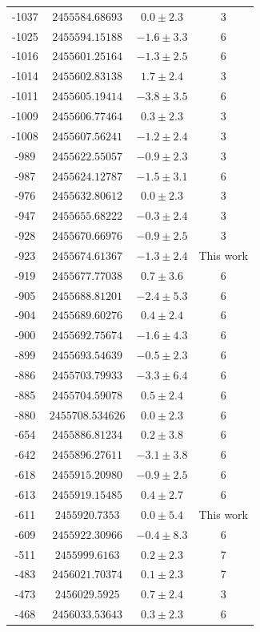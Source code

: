 \begin{ThreePartTable}
\begin{longtable}{cccc}
-1037 & $2455584.68693$ & $0.0\pm2.3$ & 3 \\
-1025 & $2455594.15188$ &  $-1.6\pm3.3$ & 6 \\
-1016 & $2455601.25164$ & $-1.3\pm2.5$ & 6\\
-1014 & $2455602.83138$ & $1.7\pm2.4$ & 3 \\
-1011 & $2455605.19414$ & $-3.8\pm3.5$ & 6 \\
-1009 & $2455606.77464$ & $0.3\pm2.3$ & 3 \\
-1008 & $2455607.56241$ & $-1.2\pm2.4$ & 3 \\
-989 & $2455622.55057$ & $-0.9\pm2.3$ & 3 \\
-987 & $2455624.12787$ & $-1.5\pm3.1$ & 6 \\
-976 & $2455632.80612$ & $0.0\pm2.3$ & 3 \\
-947 & $2455655.68222$ & $-0.3\pm2.4$ & 3 \\
-928 & $2455670.66976$ & $-0.9\pm2.5$ & 3 \\
-923 & $2455674.61367$ & $-1.3\pm2.4$ & This work \\
-919 & $2455677.77038$ & $0.7\pm3.6$ & 6  \\
-905 & $2455688.81201$ & $-2.4\pm5.3$ & 6 \\
-904 & $2455689.60276$ & $0.4\pm2.4$ & 6 \\
-900 & $2455692.75674$ & $-1.6\pm4.3$ & 6 \\
-899 & $2455693.54639$ & $-0.5\pm2.3$ & 6  \\
-886 & $2455703.79933$ & $-3.3\pm6.4$ & 6 \\
-885 & $2455704.59078$ & $0.5\pm2.4$ & 6 \\
-880 & $2455708.534626$ & $0.0\pm 2.3$ & 6  \\
-654 & $2455886.81234$ &  $0.2\pm3.8$ & 6 \\
-642 & $2455896.27611$ & $-3.1\pm3.8$ & 6 \\
-618 & $2455915.20980$ & $-0.9\pm2.5$ & 6  \\
-613 & $2455919.15485$ & $0.4\pm 2.7$ & 6\\
-611 & $2455920.7353$ & $0.0\pm5.4$ & This work \\
-609 & $2455922.30966$ & $-0.4\pm8.3$ & 6 \\
-511 & $2455999.6163$ & $0.2\pm2.3$ & 7 \\
-483 & $2456021.70374$ & $0.1\pm2.3$ & 7 \\
-473 & $2456029.5925$ & $0.7\pm 2.4$ &3 \\
-468 & $2456033.53643$ &  $0.3\pm 2.3$ & 6  \\

\end{longtable}
\end{ThreePartTable}

